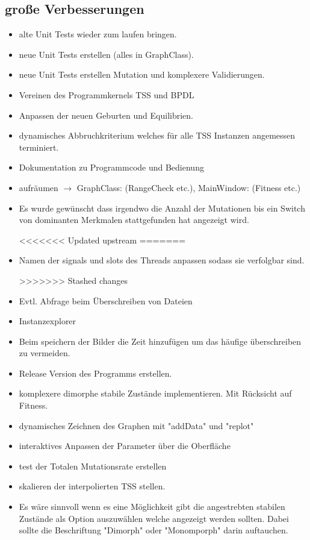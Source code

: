 \documentclass{article}
\begin{document}
\begin{itemize}
\subsection{große Verbesserungen}
	\begin{itemize}
		
		\item alte Unit Tests wieder zum laufen bringen.
		\item neue Unit Tests erstellen (alles in GraphClass).
		\item neue Unit Tests erstellen Mutation und komplexere Validierungen.
		\item Vereinen des Programmkernels TSS und BPDL
		
		\item Anpassen der neuen Geburten und Equilibrien.
		\item dynamisches Abbruchkriterium welches für alle TSS Instanzen angemessen terminiert.
		\item Dokumentation zu Programmcode und Bedienung
		\item aufräumen $ \to $ GraphClass: (RangeCheck etc.), MainWindow: (Fitness etc.)
		\item Es wurde gewünscht dass irgendwo die Anzahl der Mutationen bis ein Switch von dominanten Merkmalen stattgefunden hat angezeigt wird.
		
<<<<<<< Updated upstream
=======
		\item Namen der signals und slots des Threads anpassen sodass sie verfolgbar sind.
		
>>>>>>> Stashed changes
		\item Evtl. Abfrage beim Überschreiben von Dateien
		\item Instanzexplorer
		
		\item Beim speichern der Bilder die Zeit hinzufügen um das häufige überschreiben zu vermeiden.
		\item Release Version des Programms erstellen.

		\item komplexere dimorphe stabile Zustände implementieren. Mit Rücksicht auf Fitness.
		\item dynamisches Zeichnen des Graphen mit "{}addData"{} und "{}replot"{}
		\item interaktives Anpassen der Parameter über die Oberfläche
		\item test der Totalen Mutationsrate erstellen
		\item skalieren der interpolierten TSS stellen.
		\item Es wäre sinnvoll wenn es eine Möglichkeit gibt die angestrebten stabilen Zustände als Option auszuwählen welche angezeigt werden sollten. Dabei sollte die Beschriftung "{}Dimorph"{} oder "{}Monomporph"{} darin auftauchen.
	\end{itemize}


\end{itemize}
\end{document}

